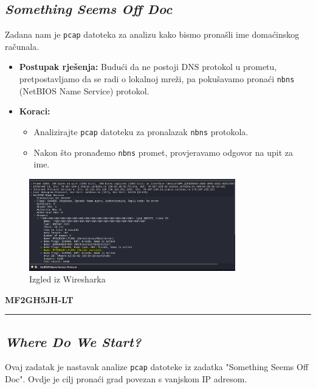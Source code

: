 \documentclass{article}
\begin{document}
\subsection{\textit{Something Seems Off Doc}}
\begin{tcolorbox}[
    colback=gray!5,  %
    colframe=gray!75,  %
    title=\textbf{Zadatak}]
    Zadana nam je \texttt{pcap} datoteka za analizu kako bismo pronašli ime domaćinskog računala.
\end{tcolorbox}

\begin{itemize}
    \item \textbf{Postupak rješenja:} Budući da ne postoji DNS protokol u prometu, pretpostavljamo da se radi o lokalnoj mreži, pa pokušavamo pronaći \texttt{nbns} (NetBIOS Name Service) protokol.
    \item \textbf{Koraci:} 
    \begin{itemize}
        \item Analizirajte \texttt{pcap} datoteku za pronalazak \texttt{nbns} protokola.
        \item Nakon što pronađemo \texttt{nbns} promet, provjeravamo odgovor na upit za ime.
    \end{itemize}
\end{itemize}

\begin{figure}[h]
    \centering
    \includegraphics[width=0.8\textwidth]{SomethingSeemsOffDoc.png}
    \caption{Izgled iz Wiresharka}
    \label{fig:flag_ws_doc}
\end{figure}

\begin{center}
    \textbf{MF2GH5JH-LT}
\end{center}

\noindent\rule{\textwidth}{0.4pt}

\subsection{\textit{Where Do We Start?}}
\begin{tcolorbox}[
    colback=gray!5,  %
    colframe=gray!75,  %
    title=\textbf{Zadatak}]
    Ovaj zadatak je nastavak analize \texttt{pcap} datoteke iz zadatka "Something Seems Off Doc". Ovdje je cilj pronaći grad povezan s vanjskom IP adresom.
\end{tcolorbox}
\end{document}
